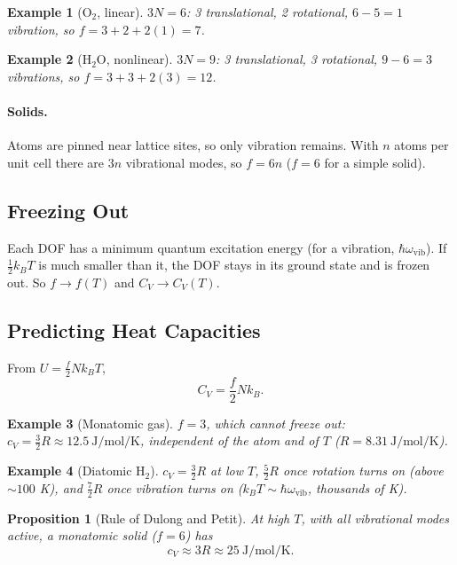 \documentclass{article}
\newtheorem*{example}{Example}
\newtheorem{proposition}{Proposition}
\begin{document}
\begin{example}[O$_2$, linear]
    $3N = 6$: 3 translational, 2 rotational, $6 - 5 = 1$ vibration, so $f = 3 + 2 + 2(1) = 7$.
\end{example}
\begin{example}[H$_2$O, nonlinear]
    $3N = 9$: 3 translational, 3 rotational, $9 - 6 = 3$ vibrations, so $f = 3 + 3 + 2(3) = 12$.
\end{example}

\paragraph{Solids.}
Atoms are pinned near lattice sites, so only vibration remains. With $n$ atoms per unit cell there are $3n$ vibrational modes, so $f = 6n$ ($f = 6$ for a simple solid).

\subsection{Freezing Out}
Each DOF has a minimum quantum excitation energy (for a vibration, $\hbar \omega_{\text{vib}}$). If $\tfrac{1}{2} k_B T$ is much smaller than it, the DOF stays in its ground state and is frozen out. So $f \to f(T)$ and $C_V \to C_V(T)$.


\subsection{Predicting Heat Capacities}
From $U = \tfrac{f}{2} N k_B T$,
\[C_V = \frac{f}{2} N k_B.\]

\begin{example}[Monatomic gas]
    $f = 3$, which cannot freeze out: $c_V = \tfrac{3}{2} R \approx \SI{12.5}{\joule\per\mole\per\kelvin}$, independent of the atom and of $T$ ($R = \SI{8.31}{\joule\per\mole\per\kelvin}$).
\end{example}
\begin{example}[Diatomic H$_2$]
    $c_V = \tfrac{3}{2}R$ at low $T$, $\tfrac{5}{2}R$ once rotation turns on (above $\sim 100$ K), and $\tfrac{7}{2}R$ once vibration turns on ($k_BT \sim \hbar\omega_{\text{vib}}$, thousands of K).
\end{example}

\begin{proposition}[Rule of Dulong and Petit]
    At high $T$, with all vibrational modes active, a monatomic solid ($f = 6$) has
    \[c_V \approx 3R \approx \SI{25}{\joule\per\mole\per\kelvin}.\]
\end{proposition}
\end{document}
